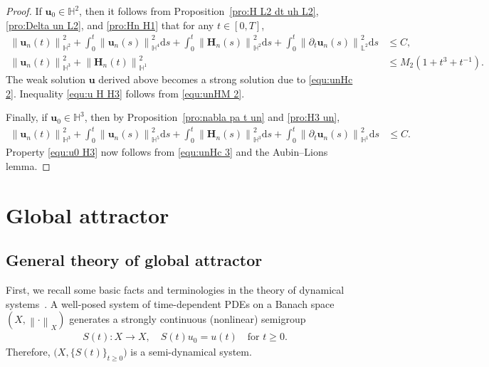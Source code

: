 \documentclass[11pt, reqno]{amsart}
\theoremstyle{definition}
\numberwithin{equation}{section}
\newcommand{\bff}{\boldsymbol}
\newcommand{\bb}{\mathbb}
\newcommand{\ds}{\mathrm{d}s}
\newcommand{\norm}[2]{\left\|{#1}\right\|_{#2}}
\begin{document}
\begin{proof}
If $\bff{u}_0\in \bb{H}^2$, then it follows from Proposition~\ref{pro:H L2 dt uh L2}, \ref{pro:Delta un L2}, and \ref{pro:Hn H1} that for any $t\in [0,T]$,
\begin{align}
\label{equ:unHc 2}
    \norm{\bff{u}_n(t)}{\bb{H}^2}^2
    +
    \int_0^t \norm{\bff{u}_n(s)}{\bb{H}^4}^2 \ds
    +
    \int_0^t \norm{\bff{H}_n(s)}{\bb{H}^2}^2 \ds
    +
    \int_0^t \norm{\partial_t \bff{u}_n(s)}{\bb{L}^2}^2 \ds
    &\leq C,
    \\
\label{equ:unHM 2}
    \norm{\bff{u}_n(t)}{\bb{H}^3}^2
    +
    \norm{\bff{H}_n(t)}{\bb{H}^1}^2
    &\leq
    M_2(1+t^3+t^{-1}).
\end{align}
The weak solution $\bff{u}$ derived above becomes a strong solution due to \eqref{equ:unHc 2}. Inequality \eqref{equ:u H H3} follows from \eqref{equ:unHM 2}.

Finally, if $\bff{u}_0\in \bb{H}^3$, then by Proposition~\ref{pro:nabla pa t un} and \ref{pro:H3 un},
\begin{align}
\label{equ:unHc 3}
    \norm{\bff{u}_n(t)}{\bb{H}^3}^2
    +
    \int_0^t \norm{\bff{u}_n(s)}{\bb{H}^5}^2 \ds
    +
    \int_0^t \norm{\bff{H}_n(s)}{\bb{H}^3}^2 \ds
    +
    \int_0^t \norm{\partial_t \bff{u}_n(s)}{\bb{H}^1}^2 \ds
    &\leq C.
\end{align}
Property \eqref{equ:u0 H3} now follows from \eqref{equ:unHc 3} and the Aubin--Lions lemma. 
\end{proof}



\section{Global attractor}

\subsection{General theory of global attractor}

First, we recall some basic facts and terminologies in the theory of dynamical systems~\cite{MirZel08, Rob01}. A well-posed system of time-dependent PDEs on a Banach space $(X, \norm{\cdot}{X})$ generates a strongly continuous (nonlinear) semigroup
\begin{align*}
	S(t): X \to X, \quad S(t)u_0 = u(t) \quad \text{for } t\geq 0.
\end{align*}
Therefore, $\big(X, \{S(t)\}_{t\geq 0} \big)$ is a semi-dynamical system. 
\end{document}
